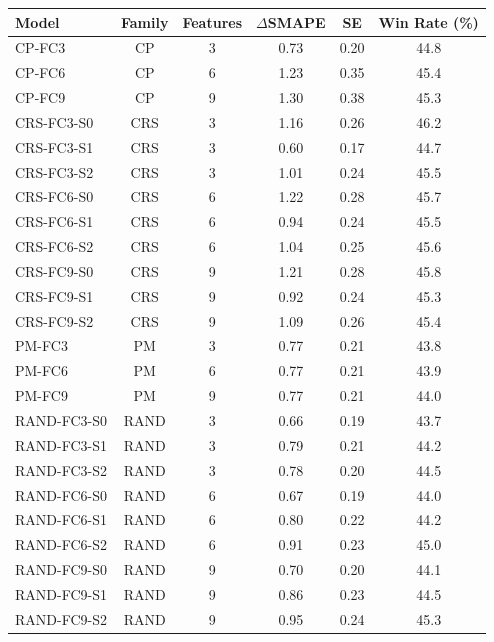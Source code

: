 \begin{tabular}{@{}lccccc@{}}
\toprule
Model & Family & Features & $\Delta$SMAPE & SE & Win Rate (\%) \\
\midrule
CP-FC3 & CP & 3 & 0.73 & 0.20 & 44.8 \\
CP-FC6 & CP & 6 & 1.23 & 0.35 & 45.4 \\
CP-FC9 & CP & 9 & 1.30 & 0.38 & 45.3 \\
CRS-FC3-S0 & CRS & 3 & 1.16 & 0.26 & 46.2 \\
CRS-FC3-S1 & CRS & 3 & 0.60 & 0.17 & 44.7 \\
CRS-FC3-S2 & CRS & 3 & 1.01 & 0.24 & 45.5 \\
CRS-FC6-S0 & CRS & 6 & 1.22 & 0.28 & 45.7 \\
CRS-FC6-S1 & CRS & 6 & 0.94 & 0.24 & 45.5 \\
CRS-FC6-S2 & CRS & 6 & 1.04 & 0.25 & 45.6 \\
CRS-FC9-S0 & CRS & 9 & 1.21 & 0.28 & 45.8 \\
CRS-FC9-S1 & CRS & 9 & 0.92 & 0.24 & 45.3 \\
CRS-FC9-S2 & CRS & 9 & 1.09 & 0.26 & 45.4 \\
PM-FC3 & PM & 3 & 0.77 & 0.21 & 43.8 \\
PM-FC6 & PM & 6 & 0.77 & 0.21 & 43.9 \\
PM-FC9 & PM & 9 & 0.77 & 0.21 & 44.0 \\
RAND-FC3-S0 & RAND & 3 & 0.66 & 0.19 & 43.7 \\
RAND-FC3-S1 & RAND & 3 & 0.79 & 0.21 & 44.2 \\
RAND-FC3-S2 & RAND & 3 & 0.78 & 0.20 & 44.5 \\
RAND-FC6-S0 & RAND & 6 & 0.67 & 0.19 & 44.0 \\
RAND-FC6-S1 & RAND & 6 & 0.80 & 0.22 & 44.2 \\
RAND-FC6-S2 & RAND & 6 & 0.91 & 0.23 & 45.0 \\
RAND-FC9-S0 & RAND & 9 & 0.70 & 0.20 & 44.1 \\
RAND-FC9-S1 & RAND & 9 & 0.86 & 0.23 & 44.5 \\
RAND-FC9-S2 & RAND & 9 & 0.95 & 0.24 & 45.3 \\
\bottomrule
\end{tabular}
